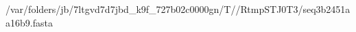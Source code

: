 \documentclass[10pt]{article}
\begin{document}
\begin{texshade}{/var/folders/jb/7ltgvd7d7jbd_k9f_727b02c0000gn/T//RtmpSTJ0T3/seq3b2451aa16b9.fasta}
\hidelogoscale
{}
\showlegend
\end{texshade}
\end{document}
